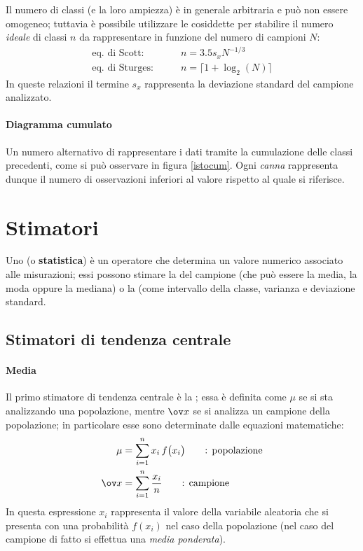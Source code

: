 		Il numero di classi (e la loro ampiezza) è in generale arbitraria e può non essere omogeneo; tuttavia è possibile utilizzare le cosiddette  per stabilire il numero \textit{ideale} di classi $n$ da rappresentare in funzione del numero di campioni $N$:
		\begin{align*}
			\textrm{eq. di Scott:} & \qquad n = 3.5 s_x N^{-1/3} \\
			\textrm{eq. di Sturges:}& \qquad n = \lceil{1 + \log_2(N) \rceil}
		\end{align*}
		In queste relazioni il termine $s_x$ rappresenta la deviazione standard del campione analizzato.
		
		\paragraph{Diagramma cumulato} Un numero alternativo di rappresentare i dati tramite la cumulazione delle classi precedenti, come si può osservare in figura \ref{istocum}. Ogni \textit{canna} rappresenta dunque il numero di osservazioni inferiori al valore rispetto al quale si riferisce.
	
	
	
\section{Stimatori} 
	Uno  (o \textbf{statistica}) è un operatore che determina un valore numerico associato alle misurazioni; essi possono stimare la  del campione (che può essere la media, la moda oppure la mediana) o la  (come intervallo della classe, varianza e deviazione standard.
		
	\subsection{Stimatori di tendenza centrale}	
		\paragraph{Media} Il primo stimatore di tendenza centrale è la ; essa è definita come $\mu$ se si sta analizzando una popolazione, mentre $\ov x$ se si analizza un campione della popolazione; in particolare esse sono determinate dalle equazioni matematiche:
		\begin{equation}
			\begin{split}
				\mu &  = \sum_{i=1}^n x_i\, f\big(x_i\big) \qquad  \textrm{: popolazione} \\
				\ov x &  = \sum_{i=1}^n \frac{x_i}{n} \qquad \textrm{: campione} 
			\end{split}
		\end{equation}
		In questa espressione $x_i$ rappresenta il valore della variabile aleatoria che si presenta con una probabilità $f(x_i)$ nel caso della popolazione (nel caso del campione di fatto si effettua una \textit{media ponderata}).
		
